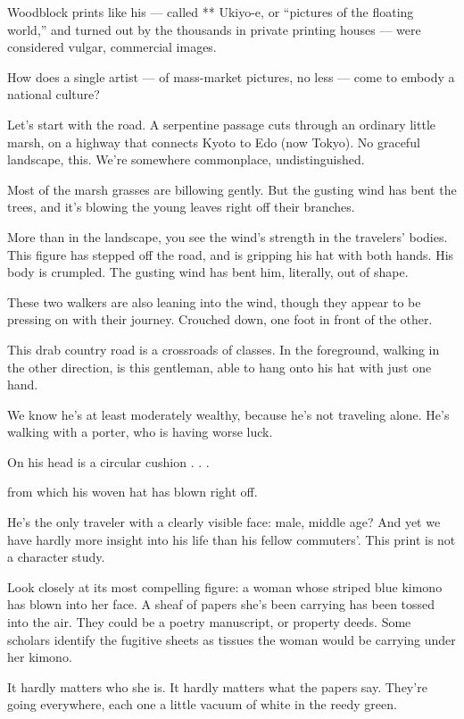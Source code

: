 Woodblock prints like his --- called ** Ukiyo-e, or ``pictures of the
floating world,'' and turned out by the thousands in private printing
houses --- were considered vulgar, commercial images.

How does a single artist --- of mass-market pictures, no less --- come
to embody a national culture?

Let's start with the road. A serpentine passage cuts through an ordinary
little marsh, on a highway that connects Kyoto to Edo (now Tokyo). No
graceful landscape, this. We're somewhere commonplace, undistinguished.

Most of the marsh grasses are billowing gently. But the gusting wind has
bent the trees, and it's blowing the young leaves right off their
branches.

More than in the landscape, you see the wind's strength in the
travelers' bodies. This figure has stepped off the road, and is gripping
his hat with both hands. His body is crumpled. The gusting wind has bent
him, literally, out of shape.

These two walkers are also leaning into the wind, though they appear to
be pressing on with their journey. Crouched down, one foot in front of
the other.

This drab country road is a crossroads of classes. In the foreground,
walking in the other direction, is this gentleman, able to hang onto his
hat with just one hand.

We know he's at least moderately wealthy, because he's not traveling
alone. He's walking with a porter, who is having worse luck.

On his head is a circular cushion . . .

from which his woven hat has blown right off.

He's the only traveler with a clearly visible face: male, middle age?
And yet we have hardly more insight into his life than his fellow
commuters'. This print is not a character study.

Look closely at its most compelling figure: a woman whose striped blue
kimono has blown into her face. A sheaf of papers she's been carrying
has been tossed into the air. They could be a poetry manuscript, or
property deeds. Some scholars identify the fugitive sheets as tissues
the woman would be carrying under her kimono.

It hardly matters who she is. It hardly matters what the papers say.
They're going everywhere, each one a little vacuum of white in the reedy
green.

